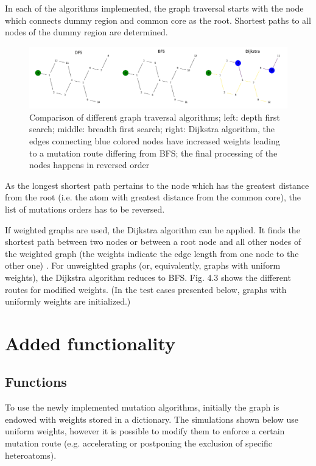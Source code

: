In each of the algorithms implemented, the graph traversal starts
with the node which connects dummy region and common core as the root.
Shortest paths to all nodes of the dummy region are determined.

\begin{figure}

\includegraphics[scale=0.45]{dfs_bfs_dijkstra_comp1}\caption{Comparison of different graph traversal algorithms; left: depth first
search; middle: breadth first search; right: Dijkstra algorithm, the
edges connecting blue colored nodes have increased weights leading
to a mutation route differing from BFS; the final processing of the
nodes happens in reversed order}

\end{figure}

As the longest shortest path pertains to the node which has the greatest
distance from the root (i.e. the atom with greatest distance from
the common core), the list of mutations orders has to be reversed.

If weighted graphs are used, the Dijkstra algorithm can be applied.
It finds the shortest path between two nodes or between a root node
and all other nodes of the weighted graph (the weights indicate the
edge length from one node to the other one) . For unweighted graphs
(or, equivalently, graphs with uniform weights), the Dijkstra algorithm
reduces to BFS. Fig. 4.3 shows the different routes for modified weights.
(In the test cases presented below, graphs with uniformly weights
are initialized.)

\section{Added functionality}

\subsection{Functions}

To use the newly implemented mutation algorithms, initially the graph
is endowed with weights stored in a dictionary. The simulations shown
below use uniform weights, however it is possible to modify them to
enforce a certain mutation route (e.g. accelerating or postponing
the exclusion of specific heteroatoms). 

